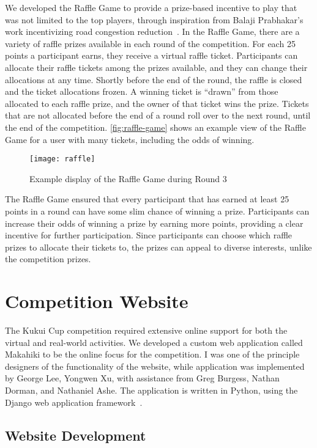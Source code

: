 We developed the Raffle Game to provide a prize-based incentive to play that was not limited to the top players, through inspiration from Balaji Prabhakar's work incentivizing road congestion reduction~\cite{Merugu2009}. In the Raffle Game, there are a variety of raffle prizes available in each round of the competition. For each 25 points a participant earns, they receive a virtual raffle ticket. Participants can allocate their raffle tickets among the prizes available, and they can change their allocations at any time. Shortly before the end of the round, the raffle is closed and the ticket allocations frozen. A winning ticket is ``drawn'' from those allocated to each raffle prize, and the owner of that ticket wins the prize. Tickets that are not allocated before the end of a round roll over to the next round, until the end of the competition. \autoref{fig:raffle-game} shows an example view of the Raffle Game for a user with many tickets, including the odds of winning.

\begin{figure}[htbp]
	\centering
		\texttt{[image: raffle]}
		\caption{Example display of the Raffle Game during Round 3}
\label{fig:raffle-game}
\end{figure}

The Raffle Game ensured that every participant that has earned at least 25 points in a round can have some slim chance of winning a prize. Participants can increase their odds of winning a prize by earning more points, providing a clear incentive for further participation. Since participants can choose which raffle prizes to allocate their tickets to, the prizes can appeal to diverse interests, unlike the competition prizes.

\section{Competition Website}

The Kukui Cup competition required extensive online support for both the virtual and real-world activities. We developed a custom web application called Makahiki to be the online focus for the competition. I was one of the principle designers of the functionality of the website, while application was implemented by George Lee, Yongwen Xu, with assistance from Greg Burgess, Nathan Dorman, and Nathaniel Ashe. The application is written in Python, using the Django web application framework~\cite{django-website}.

\subsection{Website Development}

